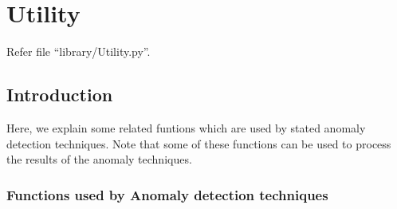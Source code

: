 \chapter{Utility}

Refer file ``library/Utility.py''.

\section{Introduction}
         
Here, we explain some related funtions which are used by stated anomaly 
detection techniques. Note that some of these functions can be used to process 
the results of the anomaly techniques.

\subsection{Functions used by Anomaly detection techniques}

